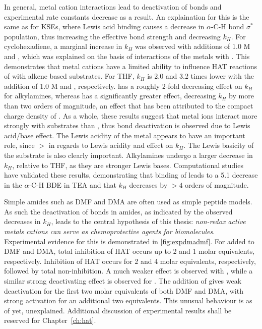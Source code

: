 In general, metal cation interactions lead to deactivation of  bonds and
experimental rate constants decrease as a result. An explaination for this is
the same as for KSEs, where Lewis acid binding causes a decrease in $\alpha$-C-H
bond $\sigma^*$ population, thus increasing the effective  bond strength and
decreasing $k_H$. For cyclohexadiene, a marginal increase in $k_H$ was observed
with additions of 1.0 M  and , which was explained on
the basis of interactions of the metals with \cumo. This demonstrates that metal
cations have a limited ability to influence HAT reactions of \cumo with alkene
based substrates. For THF, $k_H$ is 2.0 and 3.2 times lower with the addition of
1.0 M  and , respectively.  has a roughly
2-fold decreasing effect on $k_H$ for alkylamines, whereas  has a
significantly greater effect, decreasing $k_H$ by more than two orders of
magnitude, an effect that has been attributed to the compact charge density of
. As a whole, these results suggest that metal ions interact more
strongly with substrates than \cumo, thus  bond deactivation is observed due
to Lewis acid/base effect. The Lewis acidity of the metal appears to have an
important role, since  $>$  in regards to Lewis acidity
and effect on $k_H$. The Lewis basicity of the substrate is also clearly
important. Alkylamines undergo a larger decrease in $k_H$, relative to THF, as
they are stronger Lewis bases. Computational studies have validated these
results, demonstrating that binding of  leads to a 5.1 \kcalmol
decrease in the $\alpha$-C-H BDE in TEA and that $k_H$ decreases by
$>4$ orders of magnitude.\cite{Nova2014}

Simple amides such as DMF and DMA are often used as simple peptide
models.\cite{Salamone2015a} As such the deactivation of  bonds in amides, as
indicated by the observed decreases in $k_H$, leads to the central hypothesis of
this thesis: \emph{non-redox active metals cations can serve as chemoprotective
  agents for biomolecules}. Experimental evidence for this is demonstrated in
\ref{fig:expdmadmf}. For  added to DMF and DMA, total inhibition of
HAT occurs up to 2 and 1 molar equivalents, respectively. Inhibition of HAT
occurs for 2 and 4 molar equivalents, respectively, followed by total
non-inhibition. A much weaker effect is observed with , while a
similar strong deactivating effect is observed for . The addition
of  gives weak deactivation for the first two molar equivalents of
both DMF and DMA, with strong activation for an additional two equivalents. This
unusual behaviour is as of yet, unexplained. Additional discussion of
experimental results shall be reserved for Chapter~\ref{ch:hat}.

